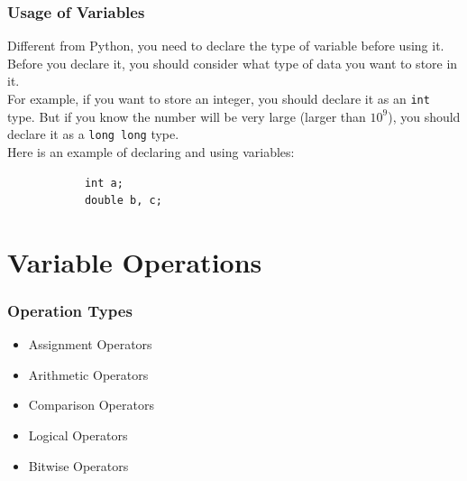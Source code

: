 \documentclass[xcolor=dvipsnames]{beamer}
\begin{document}
    \begin{frame}[fragile]
        \frametitle{Usage of Variables}
        Different from Python, you need to \alert{declare} the type of variable before using it. Before you declare it, you should consider what type of data you want to store in it.\\
        For example, if you want to store an integer, you should declare it as an \texttt{int} type. But if you know the number will be very large (larger than $10^9$), you should declare it as a \texttt{long long} type.\\
        Here is an example of declaring and using variables:
        \begin{verbatim}
            int a;
            double b, c;
        \end{verbatim}
    \end{frame}

    \section{Variable Operations}
    \begin{frame}
        \frametitle{Operation Types}
        \begin{itemize}
            \item Assignment Operators
            \item Arithmetic Operators
            \item Comparison Operators
            \item Logical Operators
            \item Bitwise Operators
        \end{itemize}
    \end{frame}
\end{document}
